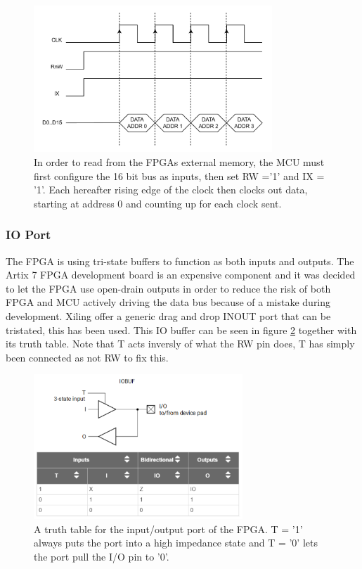 \begin{figure}[H]
    \centering
    \includegraphics[clip, trim=0 0 0 0, width=0.8\textwidth]{Sections/7_SystemDesign/Figures/MCU_IX_FETCH.pdf}
    \caption{In order to read from the FPGAs external memory, the MCU must first configure the 16 bit bus as inputs, then set RW ='1' and IX = '1'. Each hereafter rising edge of the clock then clocks out data, starting at address 0 and counting up for each clock sent.}
    \label{fig_7_2_1_CommRead_IX}
\end{figure}

\subsubsection{IO Port}
The FPGA is using tri-state buffers to function as both inputs and outputs. The Artix 7 FPGA development board is an expensive component and it was decided to let the FPGA use open-drain outputs in order to reduce the risk of both FPGA and MCU actively driving the data bus because of a mistake during development. Xiling offer a generic drag and drop INOUT port that can be tristated, this has been used. This IO buffer can be seen in figure \ref{fig_7_2_1_IOBUF} together with its truth table. Note that T acts inversly of what the RW pin does, T has simply been connected as not RW to fix this.

\begin{figure}[H]
    \centering
    \includegraphics[clip, trim=0 0 0 0, width=0.7\textwidth]{Sections/7_SystemDesign/Figures/IOBUF.pdf}
    \caption{A truth table for the input/output port of the FPGA. T = '1' always puts the port into a high impedance state and T = '0' lets the port pull the I/O pin to '0'.}
    \label{fig_7_2_1_IOBUF}
\end{figure}

